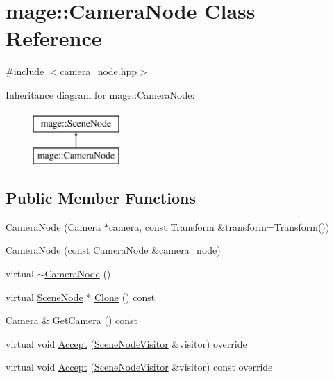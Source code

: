 \hypertarget{classmage_1_1_camera_node}{}\section{mage\+:\+:Camera\+Node Class Reference}
\label{classmage_1_1_camera_node}


{\ttfamily \#include $<$camera\+\_\+node.\+hpp$>$}

Inheritance diagram for mage\+:\+:Camera\+Node\+:\begin{figure}[H]
\begin{center}
\leavevmode
\includegraphics[height=2.000000cm]{classmage_1_1_camera_node}
\end{center}
\end{figure}
\subsection*{Public Member Functions}
\begin{DoxyCompactItemize}
\item 
\hyperlink{classmage_1_1_camera_node_aa6b469b939b268275665f5b962b82d4a}{Camera\+Node} (\hyperlink{classmage_1_1_camera}{Camera} $\ast$camera, const \hyperlink{structmage_1_1_transform}{Transform} \&transform=\hyperlink{structmage_1_1_transform}{Transform}())
\item 
\hyperlink{classmage_1_1_camera_node_aa0becc29c416c313ebda763edb1b2181}{Camera\+Node} (const \hyperlink{classmage_1_1_camera_node}{Camera\+Node} \&camera\+\_\+node)
\item 
virtual \hyperlink{classmage_1_1_camera_node_a2b66360b99bf03ee2f66a3a74be31792}{$\sim$\+Camera\+Node} ()
\item 
virtual \hyperlink{classmage_1_1_scene_node}{Scene\+Node} $\ast$ \hyperlink{classmage_1_1_camera_node_adf9a95250d1fd7e6bb9a5850a0aa7817}{Clone} () const
\item 
\hyperlink{classmage_1_1_camera}{Camera} \& \hyperlink{classmage_1_1_camera_node_a823525438bea9a62cdcd2e42b79b19d9}{Get\+Camera} () const
\item 
virtual void \hyperlink{classmage_1_1_camera_node_aed9c3c12cc4163fed880c49e43380efe}{Accept} (\hyperlink{classmage_1_1_scene_node_visitor}{Scene\+Node\+Visitor} \&visitor) override
\item 
virtual void \hyperlink{classmage_1_1_camera_node_a8b94f57b3a04f70b2c04a3d7c1ba3082}{Accept} (\hyperlink{classmage_1_1_scene_node_visitor}{Scene\+Node\+Visitor} \&visitor) const override
\end{DoxyCompactItemize}
